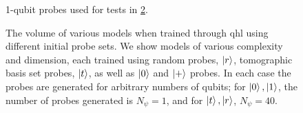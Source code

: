 \begin{figure}
    \begin{center}
        \qquad
        \qquad
        \qquad
        \qquad
    \end{center}
    \caption[Probes used for tests]{
        1-qubit probes used for tests in \cref{fig:probes_test}.
    }
    \label{fig:probes_used_bloch}
\end{figure}

\begin{figure}
    \begin{center}
    \end{center}
    \caption[Training with different probes]{
        The volume of various models when trained through \gls{qhl} using different initial \gls{probe} sets. 
        We show models of various complexity and dimension, each trained using random probes, $\ket{r}$, 
        tomographic basis set probes, $\ket{t}$, as well as $\ket{0}$ and $\ket{+}$ probes. 
        In each case the probes are generated for arbitrary numbers of qubits; 
        for $\ket{0}, \ket{1}$, the number of probes generated is $N_{\psi}=1$, 
        and for $\ket{t}, \ket{r}$, $N_{\psi}=40$.
        \figtableref
    }
    \label{fig:probes_test}
\end{figure}

